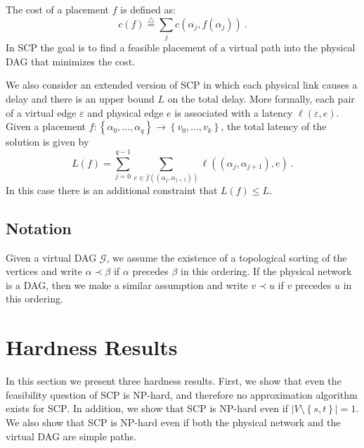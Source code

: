 \documentclass[11pt]{article}
\newcommand{\eqdf}{\stackrel{\scriptscriptstyle \triangle}{=}}
\newcommand{\set}[1]{\left\{ #1 \right\}}
\newcommand{\abs}[1]{\left| #1 \right|}
\newcommand{\eps}{\varepsilon}
\newcommand{\scp}{\textsc{SCP}\xspace}
\newcommand{\calE}{\mathcal{E}}
\newcommand{\calG}{\mathcal{G}}
\newcommand{\calV}{\mathcal{V}}
\begin{document}
The cost of a placement $f$ is defined as:
\[
c(f) \eqdf \sum_j c(\alpha_j,f(\alpha_j))
~.
\]
In \scp the goal is to find a feasible placement of a virtual path
into the physical DAG that minimizes the cost.


We also consider an extended version of \scp in which each physical
link causes a delay and there is an upper bound $L$ on the total
delay.  More formally, each pair of a virtual edge $\eps$ and physical
edge $e$ is associated with a latency $\ell(\eps,e)$.
%
Given a placement $f: \set{\alpha_0,\ldots,\alpha_q} \to
\set{v_0,\ldots,v_k}$, the total latency of the solution is given by
\[
L(f)
= \sum_{j=0}^{q-1} \sum_{e \in \bar{f}((\alpha_j,\alpha_{j+1}))} \ell((\alpha_j,\alpha_{j+1}),e)
~.
\]
In this case there is an additional constraint that $L(f) \leq L$.



%

\subsection{Notation}
%
Given a virtual DAG $\calG$, we assume the existence of a topological
sorting of the vertices and write $\alpha \prec \beta$ if $\alpha$
precedes $\beta$ in this ordering.  If the physical network is a DAG,
then we make a similar assumption and write $v \prec u$ if $v$
precedes $u$ in this ordering.



\section{Hardness Results}

In this section we present three hardness results.  First, we show
that even the feasibility question of \scp is NP-hard, and therefore
no approximation algorithm exists for \scp.  In addition, we show that
\scp is NP-hard even if $\abs{V \setminus \set{s,t}} = 1$.  We also
show that \scp is NP-hard even if both the physical network and the
virtual DAG are simple paths.
\end{document}

